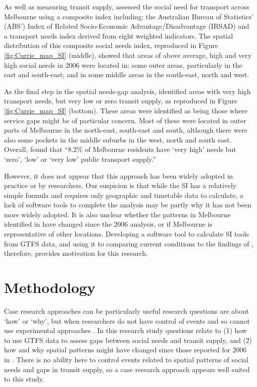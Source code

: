 \documentclass[preprint, 3p,
authoryear]{elsarticle} %
\begin{document}
As well as measuring transit supply, \citet{currie2010identifying}
assessed the social need for transport across Melbourne using a
composite index including: the Australian Bureau of Statistics' (ABS')
Index of Related Socio-Economic Advantage/Disadvantage (IRSAD) and a
transport needs index derived from eight weighted indicators. The
spatial distribution of this composite social needs index, reproduced in
Figure \ref{fig:Currie_map_SI} (middle), showed that areas of above
average, high and very high social needs in 2006 were located in: some
outer areas, particularly in the east and south-east; and in some middle
areas in the south-east, north and west.

As the final step in the spatial needs-gap analysis,
\citet{currie2010identifying} identified areas with very high transport
needs, but very low or zero transit supply, as reproduced in Figure
\ref{fig:Currie_map_SI} (bottom). These areas were identified as being
those where service gaps might be of particular concern. Most of these
were located in outer parts of Melbourne in the north-east, south-east
and south, although there were also some pockets in the middle suburbs
in the west, north and south east. Overall,
\citet{currie2010identifying} found that ``8.2\% of Melbourne residents
have `very high' needs but `zero', `low' or `very low' public transport
supply.''

However, it does not appear that this approach has been widely adopted
in practice or by researchers. Our suspicion is that while the SI has a
relatively simple formula and requires only geographic and timetable
data to calculate, a lack of software tools to complete the analysis may
be partly why it has not been more widely adopted. It is also unclear
whether the patterns in Melbourne identified in
\citet{currie2010identifying} have changed since the 2006 analysis, or
if Melbourne is representative of other locations. Developing a software
tool to calculate SI tools from GTFS data, and using it to comparing
current conditions to the findings of \citet{currie2010identifying},
therefore, provides motivation for this research.

\section{Methodology}\label{methodology}

Case research approaches can be particularly useful research questions
are about `how' or `why', but when researchers do not have control of
events and so cannot use experimental approaches \citep{Yin2009aa}. In
this research study questions relate to (1) how to use GTFS data to
assess gaps between social needs and transit supply, and (2) how and why
spatial patterns might have changed since those reported for 2006 in
\citet{currie2010identifying}. There is no ability here to control
events related to spatial patterns of social needs and gaps in transit
supply, so a case research approach appears well suited to this study.
\end{document}
